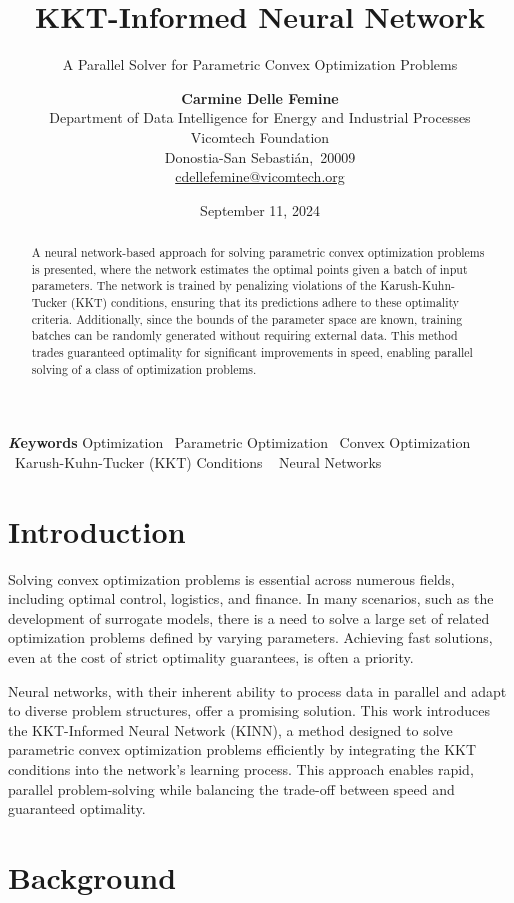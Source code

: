 \documentclass[
]{article}
\title{KKT-Informed Neural Network}
\subtitle{A Parallel Solver for Parametric Convex Optimization Problems}
\author{\textbf{Carmine Delle Femine}\\Department of Data Intelligence
for Energy and Industrial Processes\\Vicomtech Foundation\\Donostia-San
Sebastián,\ 20009\\\href{mailto:cdellefemine@vicomtech.org}{cdellefemine@vicomtech.org}}
\date{September 11, 2024}
\begin{document}
\maketitle
\begin{abstract}
A neural network-based approach for solving parametric convex
optimization problems is presented, where the network estimates the
optimal points given a batch of input parameters. The network is trained
by penalizing violations of the Karush-Kuhn-Tucker (KKT) conditions,
ensuring that its predictions adhere to these optimality criteria.
Additionally, since the bounds of the parameter space are known,
training batches can be randomly generated without requiring external
data. This method trades guaranteed optimality for significant
improvements in speed, enabling parallel solving of a class of
optimization problems.
\end{abstract}
{\bfseries \emph Keywords}
\def\sep{\textbullet\ }
Optimization \sep Parametric Optimization \sep Convex
Optimization \sep Karush-Kuhn-Tucker (KKT) Conditions \sep 
Neural Networks



\section{Introduction}\label{introduction}

Solving convex optimization problems is essential across numerous
fields, including optimal control, logistics, and finance. In many
scenarios, such as the development of surrogate models, there is a need
to solve a large set of related optimization problems defined by varying
parameters. Achieving fast solutions, even at the cost of strict
optimality guarantees, is often a priority.

Neural networks, with their inherent ability to process data in parallel
and adapt to diverse problem structures, offer a promising solution.
This work introduces the KKT-Informed Neural Network (KINN), a method
designed to solve parametric convex optimization problems efficiently by
integrating the KKT conditions into the network's learning process. This
approach enables rapid, parallel problem-solving while balancing the
trade-off between speed and guaranteed optimality.

\section{Background}\label{background}
\end{document}
